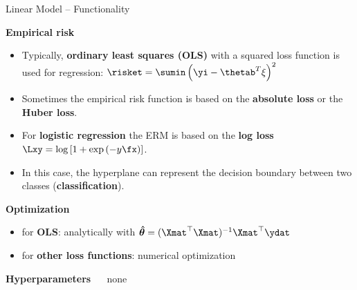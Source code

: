 \documentclass[11pt,compress,t,notes=noshow, xcolor=table]{beamer}
\newcommand{\highlight}[1]{\textcolor{highlightcol}{\textbf{#1}}}
\begin{document}
\begin{frame}{Linear Model -- Functionality}

\footnotesize

\highlight{Empirical risk}
\begin{itemize}\footnotesize
  \item Typically, \textbf{ordinary least squares (OLS)} with a squared loss function is used for regression: $\risket  = \sumin \left(\yi - \thetab^T \xi\right)^2$
    
   \item Sometimes the empirical risk function is based on the \textbf{absolute loss} or the \textbf{Huber loss}. %
  
  \item For \textbf{logistic regression} the ERM is based on the \textbf{log loss} $\Lxy = \log \left[1 + \exp \left(-y\fx\right)\right]$.
  
  \item In this case, the hyperplane can represent the decision boundary between two classes (\textbf{classification}). 


\end{itemize}

\footnotesize

\medskip

\highlight{Optimization} ~~ 
\begin{itemize}\footnotesize
  \item for \textbf{OLS}: analytically with $\bm{\hat \theta} = (\Xmat^\top \Xmat)^{-1} \Xmat^\top\ydat$
  \item for \textbf{other loss functions}: numerical optimization 
\end{itemize}

\medskip

\highlight{Hyperparameters} ~~ none

\end{frame}

\end{document}

